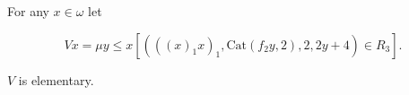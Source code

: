 For any $x \in \omega$ let

$$Vx = \mu y \leq x \left[ (((x)_1x)_1, \text{Cat}(f_2y, 2), 2, 2y + 4) \in R_3 \right].$$

$V$ is elementary.

